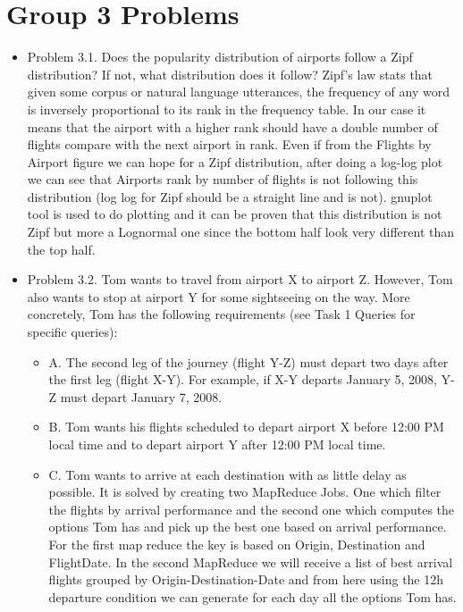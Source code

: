 \documentclass[fontsize=11pt,paper=a4]{scrartcl}
\begin{document}
\section{Group 3 Problems}
\begin{itemize}
\item Problem 3.1. Does the popularity distribution of airports follow a Zipf distribution? If not, what distribution does it follow?
Zipf’s law stats that given some corpus or natural language utterances, the frequency of any word is inversely proportional to its rank in the frequency table. In our case it means that the airport with a higher rank should have a double number of flights compare with the next airport in rank. Even if from the Flights by Airport figure we can hope for a Zipf distribution, after doing a log-log plot we can see that Airports rank by number of flights is not following this distribution (log log for Zipf should be a straight line and is not). gnuplot tool is used to do plotting and it can be proven that this distribution is not Zipf but more a Lognormal one since the bottom half look very different than the top half. 
\item Problem 3.2. Tom wants to travel from airport X to airport Z. However, Tom also wants to stop at airport Y for some sightseeing on the way. More concretely, Tom has the following requirements (see Task 1 Queries for specific queries):
\begin{itemize}
\item A. The second leg of the journey (flight Y-Z) must depart two days after the first leg (flight X-Y). For example, if X-Y departs January 5, 2008, Y-Z must depart January 7, 2008.
\item B. Tom wants his flights scheduled to depart airport X before 12:00 PM local time and to depart airport Y after 12:00 PM local time.
\item C. Tom wants to arrive at each destination with as little delay as possible.
It is solved by creating two MapReduce Jobs. One which filter the
flights by arrival performance and the second one which computes the options Tom has and pick up the best one based on arrival performance. For the first map reduce the key is based on Origin, Destination and FlightDate. In the second MapReduce we will receive a list of best arrival flights grouped by Origin-Destination-Date and from here using the 12h departure condition we can generate for each day all the options Tom has.
\end{itemize}
\end{itemize}
\end{document}
